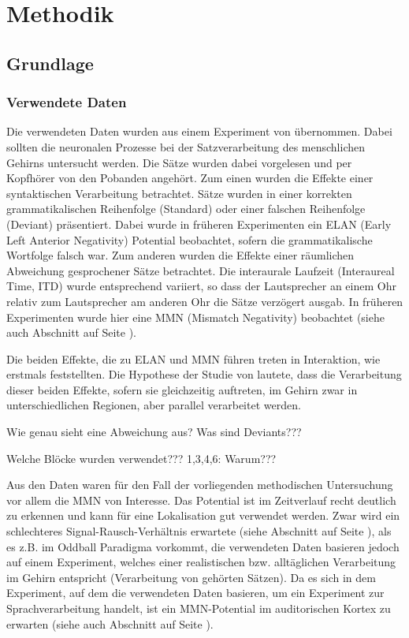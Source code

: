 \documentclass[doc,a4paper,12pt]{apa6}
\makeatletter
\DeclareRobustCommand*{\nameref}[1]{%
      \glqq{\myorg@nameref{#1}}\grqq%
    }%
\makeatother
\begin{document}
\newpage

\section{Methodik}
\label{sec:methodik}

\subsection{Grundlage}

\subsubsection{Verwendete Daten}

Die verwendeten Daten wurden aus einem Experiment von \textcite{herrmann2011syntactic} übernommen. Dabei sollten die neuronalen Prozesse bei der Satzverarbeitung des menschlichen Gehirns untersucht werden. Die Sätze wurden dabei vorgelesen und per Kopfhörer von den Pobanden angehört. Zum einen wurden die Effekte einer syntaktischen Verarbeitung betrachtet. Sätze wurden in einer korrekten grammatikalischen Reihenfolge (Standard) oder einer falschen Reihenfolge (Deviant) präsentiert. Dabei wurde in früheren Experimenten ein ELAN (Early Left Anterior Negativity) Potential beobachtet, sofern die grammatikalische Wortfolge falsch war. Zum anderen wurden die Effekte einer räumlichen Abweichung gesprochener Sätze betrachtet. Die interaurale Laufzeit (Interaureal Time, ITD) wurde entsprechend variiert, so dass der Lautsprecher an einem Ohr relativ zum Lautsprecher am anderen Ohr die Sätze verzögert ausgab. In früheren Experimenten wurde hier eine MMN (Mismatch Negativity) beobachtet (siehe auch Abschnitt \nameref{sec:erf} auf Seite \pageref{sec:erf}).

Die beiden Effekte, die zu ELAN und MMN führen treten in Interaktion, wie \textcite{hahne2002differential} erstmals feststellten. Die Hypothese der Studie von \textcite{herrmann2011syntactic} lautete, dass die Verarbeitung dieser beiden Effekte, sofern sie gleichzeitig auftreten, im Gehirn zwar in unterschiedlichen Regionen, aber parallel verarbeitet werden.

Wie genau sieht eine Abweichung aus? Was sind Deviants???

Welche Blöcke wurden verwendet??? 1,3,4,6: Warum???

Aus den Daten waren für den Fall der vorliegenden methodischen Untersuchung vor allem die MMN von Interesse. Das Potential ist im Zeitverlauf recht deutlich zu erkennen und kann für eine Lokalisation gut verwendet werden. Zwar wird ein schlechteres Signal-Rausch-Verhältnis erwartete (siehe Abschnitt \nameref{sec:snr} auf Seite \pageref{sec:snr}), als es z.B. im Oddball Paradigma \parencite{naatanen2004mismatch} vorkommt, die verwendeten Daten basieren jedoch auf einem Experiment, welches einer realistischen bzw. alltäglichen Verarbeitung im Gehirn entspricht (Verarbeitung von gehörten Sätzen). Da es sich in dem Experiment, auf dem die verwendeten Daten basieren, um ein Experiment zur Sprachverarbeitung handelt, ist ein MMN-Potential im auditorischen Kortex zu erwarten (siehe auch Abschnitt \nameref{sec:audicort} auf Seite \pageref{sec:audicort}).
\end{document}
